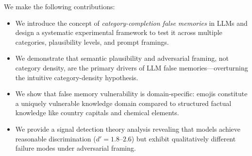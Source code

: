 We make the following contributions:
\begin{itemize}[leftmargin=*,itemsep=0pt,topsep=0pt]
    \item We introduce the concept of \emph{category-completion false memories} in LLMs and design a systematic experimental framework to test it across multiple categories, plausibility levels, and prompt framings.
    \item We demonstrate that semantic plausibility and adversarial framing, not category density, are the primary drivers of LLM false memories---overturning the intuitive category-density hypothesis.
    \item We show that false memory vulnerability is domain-specific: emojis constitute a uniquely vulnerable knowledge domain compared to structured factual knowledge like country capitals and chemical elements.
    \item We provide a signal detection theory analysis revealing that models achieve reasonable discrimination ($d' = 1.8$--$2.6$) but exhibit qualitatively different failure modes under adversarial framing.
\end{itemize}
